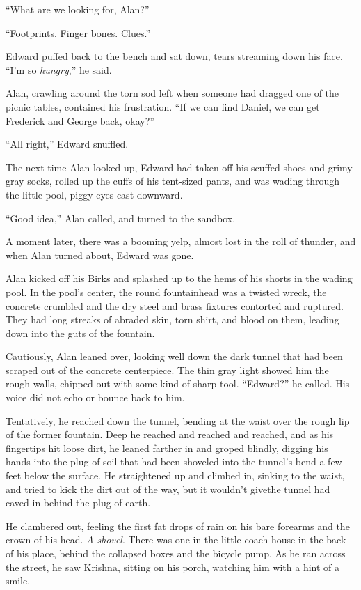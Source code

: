``What are we looking for, Alan?''

``Footprints.  Finger bones.  Clues.''

Edward puffed back to the bench and sat down, tears streaming down his
face.  ``I'm so \textit{hungry},'' he said.

Alan, crawling around the torn sod left when someone had dragged one
of the picnic tables, contained his frustration.  ``If we can find
Daniel, we can get Frederick and George back, okay?''

``All right,'' Edward snuffled.

The next time Alan looked up, Edward had taken off his scuffed shoes
and grimy-gray socks, rolled up the cuffs of his tent-sized pants, and
was wading through the little pool, piggy eyes cast downward.

``Good idea,'' Alan called, and turned to the sandbox.

A moment later, there was a booming yelp, almost lost in the roll of
thunder, and when Alan turned about, Edward was gone.

Alan kicked off his Birks and splashed up to the hems of his shorts in
the wading pool.  In the pool's center, the round fountainhead was a
twisted wreck, the concrete crumbled and the dry steel and brass
fixtures contorted and ruptured.  They had long streaks of abraded
skin, torn shirt, and blood on them, leading down into the guts of the
fountain.

Cautiously, Alan leaned over, looking well down the dark tunnel that
had been scraped out of the concrete centerpiece.  The thin gray light
showed him the rough walls, chipped out with some kind of sharp tool. 
``Edward?'' he called.  His voice did not echo or bounce back to him.

Tentatively, he reached down the tunnel, bending at the waist over the
rough lip of the former fountain.  Deep he reached and reached and
reached, and as his fingertips hit loose dirt, he leaned farther in
and groped blindly, digging his hands into the plug of soil that had
been shoveled into the tunnel's bend a few feet below the surface.  He
straightened up and climbed in, sinking to the waist, and tried to
kick the dirt out of the way, but it wouldn't give\dash{}the tunnel had
caved in behind the plug of earth.

He clambered out, feeling the first fat drops of rain on his bare
forearms and the crown of his head.  \textit{A shovel}.  There was one
in the little coach house in the back of his place, behind the
collapsed boxes and the bicycle pump.  As he ran across the street, he
saw Krishna, sitting on his porch, watching him with a hint of a
smile.

